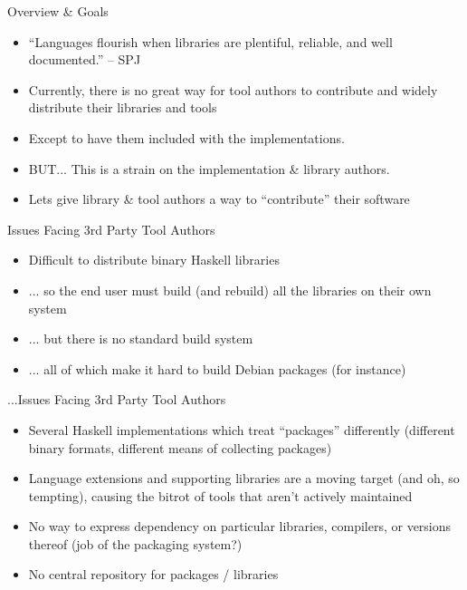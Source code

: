 \documentclass[pdf,rico,slideColor,colorBG]{prosper}
\begin{document}




\begin{slide}{Overview \& Goals}
\begin{itemize}
  \item ``Languages flourish when libraries are plentiful, reliable, and well documented.'' -- SPJ
  \item Currently, there is no great way for tool authors to contribute and widely distribute their libraries and tools
  \item Except to have them included with the implementations.
  \item BUT... This is a strain on the implementation \& library authors.
  \item Lets give library \& tool authors a way to ``contribute'' their software
\end{itemize}
\end{slide}

\begin{slide}{Issues Facing 3rd Party Tool Authors}
\begin{itemize}
  \item Difficult to distribute binary Haskell libraries
  \item ... so the end user must build (and rebuild) all the libraries on their own system
  \item ... but there is no standard build system
  \item ... all of which make it hard to build Debian packages (for instance)
\end{itemize}
\end{slide}


\begin{slide}{...Issues Facing 3rd Party Tool Authors}
\begin{itemize}
  \item Several Haskell implementations which treat ``packages'' differently (different binary formats, different means of collecting packages)
  \item Language extensions and supporting libraries are a moving target (and oh, so tempting), causing the bitrot of tools that aren't actively maintained
  \item No way to express dependency on particular libraries, compilers, or versions thereof (job of the packaging system?)
  \item No central repository for packages / libraries
\end{itemize}
\end{slide}
\end{document}
